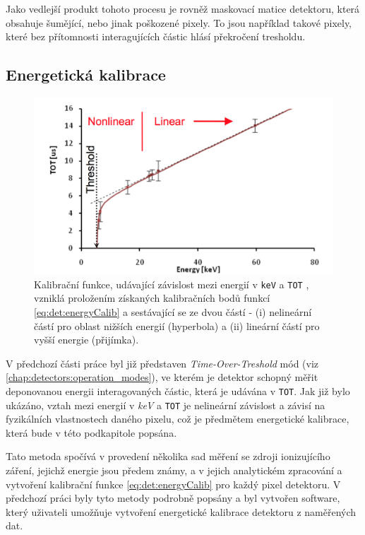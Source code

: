 Jako vedlejší produkt tohoto procesu je rovněž maskovací matice detektoru, která obsahuje šumějící, nebo jinak poškozené pixely. To jsou například takové pixely, které bez přítomnosti interagujících částic hlásí překročení tresholdu.

\subsection{Energetická kalibrace}\label{chap:detectors:calibration:energy}
\begin{figure}[th]
	\begin{center}
		\includegraphics[width=13cm]{figures/calib_function.png}
		\caption{Kalibrační funkce, udávající závislost mezi energií v \texttt{keV} a \texttt{TOT} \cite{Jakubek2011S262}, vzniklá proložením získaných kalibračních bodů funkcí \ref{eq:det:energyCalib} a sestávající se ze dvou částí - (i) nelineární částí pro oblast nižších energií (hyperbola) a (ii) lineární částí pro vyšší energie (přijímka).}
		\label{fig:det:calib:calib_function}
	\end{center}
\end{figure}

V předchozí části práce byl již představen \textit{Time-Over-Treshold} mód (viz \ref{chap:detectors:operation_modes}), ve kterém je detektor schopný měřit deponovanou energii interagovaných částic, která je udávána v \texttt{TOT}. Jak již bylo ukázáno, vztah mezi energií v \textit{keV} a \texttt{TOT} je nelineární závislost a závisí na fyzikálních vlastnostech daného pixelu, což je předmětem energetické kalibrace, která bude v této podkapitole popsána.

Tato metoda \cite{Jakubek2011S262} spočívá v provedení několika sad měření se zdroji ionizujícího záření, jejichž energie jsou předem známy, a v jejich analytickém zpracování a vytvoření kalibrační funkce \ref{eq:det:energyCalib} pro každý pixel detektoru. V předchozí práci \cite{BegeraBcThesis2016} byly tyto metody podrobně popsány a byl vytvořen software, který uživateli umožňuje vytvoření energetické kalibrace detektoru z naměřených dat.

